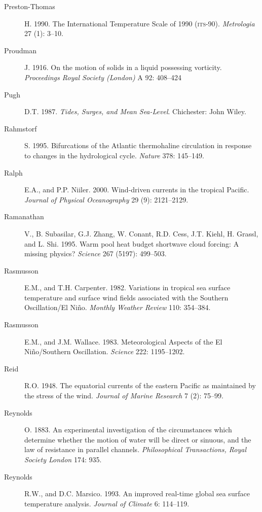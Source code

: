 \begin{description}
\item [Preston-Thomas]H. 1990. The International Temperature Scale of 1990
(\textsc{its}-90). \textit{Metrologia} 27 (1): 3--10.

\item [Proudman]J. 1916. On the motion of solids in a liquid possessing
vorticity. \textit{Proceedings Royal Society (London)} A 92: 408--424 

\item [Pugh]D.T. 1987. \textit{Tides, Surges, and Mean Sea-Level}.  Chichester:
John Wiley.

\item [Rahmstorf]S. 1995. Bifurcations of the Atlantic thermohaline circulation
in response to changes in the hydrological cycle. \textit{Nature} 378: 145--149.

\item [Ralph]E.A., and P.P. Niiler. 2000. Wind-driven currents in the tropical
Pacific. \textit{Journal of Physical Oceanography} 29 (9): 2121--2129.

\item [Ramanathan]V., B. Subasilar, G.J. Zhang, W. Conant, R.D. Cess,
J.T. Kiehl, H. Grassl, and L. Shi. 1995. Warm pool heat budget shortwave cloud
forcing: A missing physics? \textit{Science} 267 (5197): 499--503.

\item [Rasmusson]E.M., and T.H. Carpenter. 1982. Variations in tropical sea
surface temperature and surface wind fields associated with the Southern
Oscillation/El Ni\~{n}o. \textit{Monthly Weather Review} 110: 354--384.

\item [Rasmusson]E.M., and J.M. Wallace. 1983. Meteorological Aspects of the
El Ni\~{n}o/Southern Oscillation. \textit{Science} 222: 1195--1202.

\item [Reid]R.O. 1948. The equatorial currents of the eastern Pacific as
maintained by the stress of the wind. \textit{Journal of Marine Research} 7 (2):
75--99.

\item [Reynolds]O. 1883. An experimental investigation of the circumstances
which determine whether the motion of water will be direct or sinuous, and the
law of resistance in parallel channels. \textit{Philosophical Transactions, Royal
Society London} 174: 935. 

\item [Reynolds]R.W., and D.C. Marsico. 1993. An improved real-time global sea
surface temperature analysis. \textit{Journal of Climate} 6: 114--119.


\end{description}
